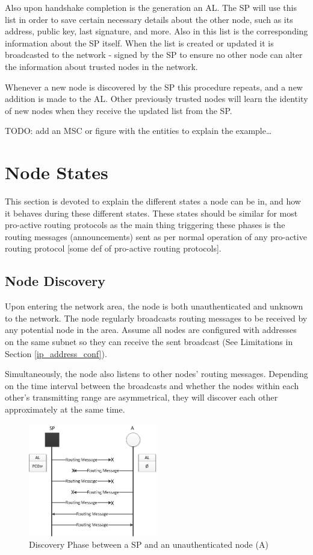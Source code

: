 Also upon handshake completion is the generation an \ac{AL}. The \ac{SP} will
use this list in order to save certain necessary details about the other node,
such as its address, public key, last signature, and more. Also in this list is
the corresponding information about the \ac{SP} itself. When the list is created
or updated it is broadcasted to the network - signed by the \ac{SP} to ensure no
other node can alter the information about trusted nodes in the network.

Whenever a new node is discovered by the \ac{SP} this procedure repeats, and a
new addition is made to the \ac{AL}. Other previously trusted nodes will learn
the identity of new nodes when they receive the updated list from the \ac{SP}.

TODO: add an MSC or figure with the entities to explain the example\ldots

\section{Node States}
This section is devoted to explain the different states a node can be in, and
how it behaves during these different states. These states should be similar for
most pro-active routing protocols as the main thing triggering these phases
is the routing messages (announcements) sent as per normal operation of any
pro-active routing protocol [some def of pro-active routing protocols].

\subsection{Node Discovery}
Upon entering the network area, the node is both unauthenticated and unknown to
the network. The node regularly broadcasts routing messages to be received by
any potential node in the area. Assume all nodes are configured with addresses
on the same subnet so they can receive the sent broadcast (See Limitations in
Section \ref{ip_address_conf}).

Simultaneously, the node also listens to other nodes' routing messages.
Depending on the time interval between the broadcasts and whether the nodes
within each other's transmitting range are asymmetrical, they will discover each
other approximately at the same time.

\begin{figure}[h]
	\centering
  	\includegraphics[width=0.5\textwidth]{images/node_states_discovery.png}
  	\caption{Discovery Phase between a \acf{SP} and an unauthenticated node (A)}
	\label{fig:node_states_discovery}
\end{figure}

